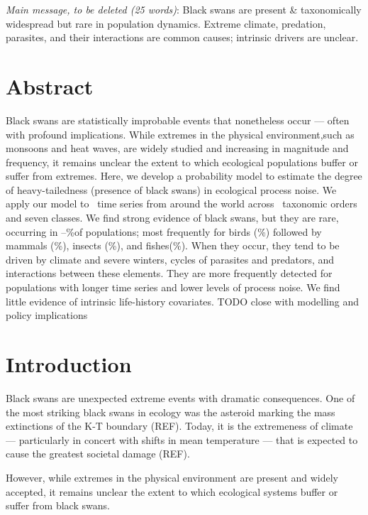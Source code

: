 
\noindent
\emph{Main message, to be deleted (25 words)}: Black swans are present \&
taxonomically widespread but rare in population dynamics. Extreme climate,
predation, parasites, and their interactions are common causes; intrinsic
drivers are unclear.

\section{Abstract}

Black swans are statistically improbable events that nonetheless occur --- often
with profound implications. While extremes in the physical environment,such as
monsoons and heat waves, are widely studied and increasing in magnitude and
frequency, it remains unclear the extent to which ecological populations buffer
or suffer from extremes. Here, we develop a probability model to estimate the
degree of heavy-tailedness (presence of black swans) in ecological process
noise. We apply our model to \NPops~time series from around the world across
\NOrders~taxonomic orders and seven classes. We find strong evidence of black
swans, but they are rare, occurring in \overallMinPerc--\overallMaxPerc\%of
populations; most frequently for birds (\AvesRangePerc\%) followed by mammals
(\MammaliaRangePerc\%), insects (\InsectaRangePerc\%), and
fishes(\OsteichthyesRangePerc\%). When they occur, they tend to be driven by
climate and severe winters, cycles of parasites and predators, and interactions
between these elements. They are more frequently detected for populations with
longer time series and lower levels of process noise. We find little evidence
of intrinsic life-history covariates. TODO close with modelling and policy
implications

\section{Introduction}

Black swans are unexpected extreme events with dramatic consequences. One of
the most striking black swans in ecology was the asteroid marking the mass
extinctions of the K-T boundary (REF). Today, it is the extremeness of climate
--- particularly in concert with shifts in mean temperature --- that is
expected to cause the greatest societal damage (REF).

However, while extremes in the physical environment are present and widely
accepted, it remains unclear the extent to which ecological systems buffer or
suffer from black swans.

